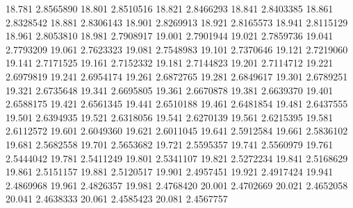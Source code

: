 18.781 2.8565890
18.801 2.8510516
18.821 2.8466293
18.841 2.8403385
18.861 2.8328542
18.881 2.8306143
18.901 2.8269913
18.921 2.8165573
18.941 2.8115129
18.961 2.8053810
18.981 2.7908917
19.001 2.7901944
19.021 2.7859736
19.041 2.7793209
19.061 2.7623323
19.081 2.7548983
19.101 2.7370646
19.121 2.7219060
19.141 2.7171525
19.161 2.7152332
19.181 2.7144823
19.201 2.7114712
19.221 2.6979819
19.241 2.6954174
19.261 2.6872765
19.281 2.6849617
19.301 2.6789251
19.321 2.6735648
19.341 2.6695805
19.361 2.6670878
19.381 2.6639370
19.401 2.6588175
19.421 2.6561345
19.441 2.6510188
19.461 2.6481854
19.481 2.6437555
19.501 2.6394935
19.521 2.6318056
19.541 2.6270139
19.561 2.6215395
19.581 2.6112572
19.601 2.6049360
19.621 2.6011045
19.641 2.5912584
19.661 2.5836102
19.681 2.5682558
19.701 2.5653682
19.721 2.5595357
19.741 2.5560979
19.761 2.5444042
19.781 2.5411249
19.801 2.5341107
19.821 2.5272234
19.841 2.5168629
19.861 2.5151157
19.881 2.5120517
19.901 2.4957451
19.921 2.4917424
19.941 2.4869968
19.961 2.4826357
19.981 2.4768420
20.001 2.4702669
20.021 2.4652058
20.041 2.4638333
20.061 2.4585423
20.081 2.4567757

